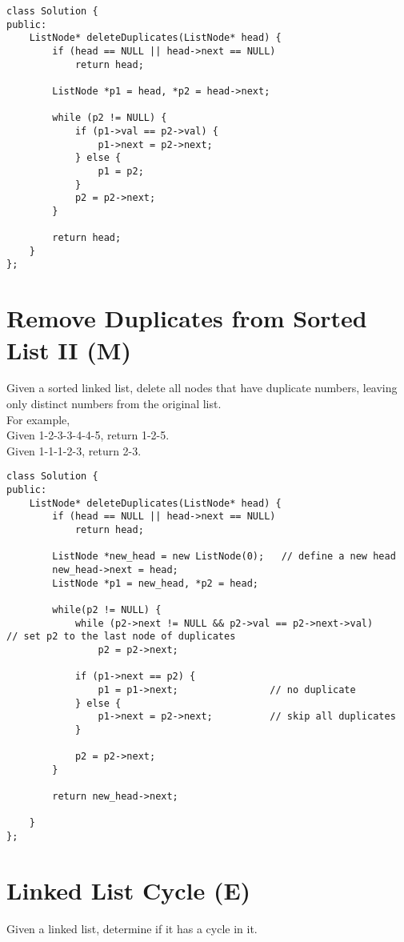 \begin{lstlisting}
class Solution {
public:
    ListNode* deleteDuplicates(ListNode* head) {
        if (head == NULL || head->next == NULL)
            return head;
        
        ListNode *p1 = head, *p2 = head->next;
        
        while (p2 != NULL) {
            if (p1->val == p2->val) {
                p1->next = p2->next; 
            } else {
                p1 = p2;
            }
            p2 = p2->next;
        }
        
        return head;
    }
};
\end{lstlisting}


\section{Remove Duplicates from Sorted List II (M)}
Given a sorted linked list, delete all nodes that have duplicate numbers, leaving only distinct numbers from the original list.\\

For example,\\
Given 1-2-3-3-4-4-5, return 1-2-5.\\
Given 1-1-1-2-3, return 2-3. \\

\begin{lstlisting}
class Solution {
public:
    ListNode* deleteDuplicates(ListNode* head) {
        if (head == NULL || head->next == NULL)
            return head;
        
        ListNode *new_head = new ListNode(0);   // define a new head
        new_head->next = head;
        ListNode *p1 = new_head, *p2 = head;
        
        while(p2 != NULL) {
            while (p2->next != NULL && p2->val == p2->next->val)		// set p2 to the last node of duplicates
                p2 = p2->next;
            
            if (p1->next == p2) {
                p1 = p1->next;                // no duplicate
            } else {
                p1->next = p2->next;          // skip all duplicates
            }
            
            p2 = p2->next;
        }
        
        return new_head->next;
        
    }
};
\end{lstlisting}


\section{Linked List Cycle (E)}
Given a linked list, determine if it has a cycle in it. \\

